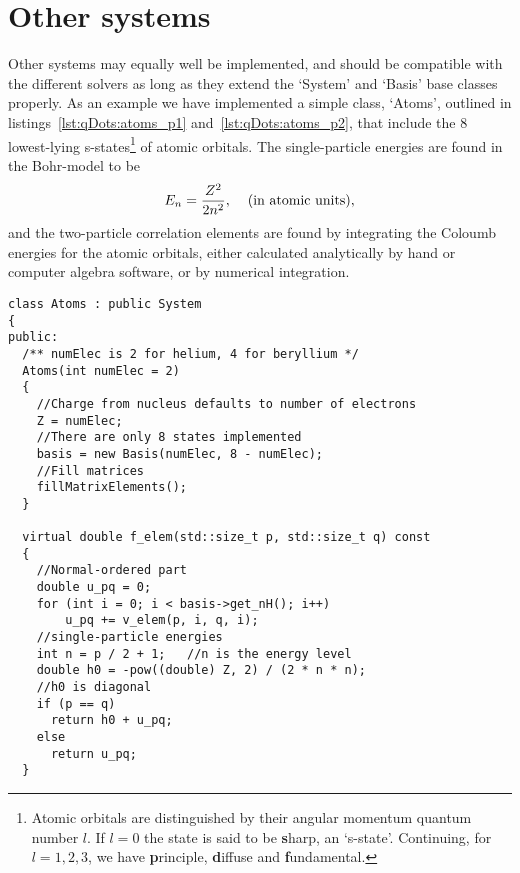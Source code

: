\section{Other systems}
Other systems may equally well be implemented, and should be compatible with the different solvers as long as they extend the `System' and `Basis' base classes properly.
As an example we have implemented a simple class, `Atoms', outlined in listings~\ref{lst:qDots:atoms_p1} and~\ref{lst:qDots:atoms_p2}, that include the 8 lowest-lying s-states\footnote{Atomic orbitals are distinguished by their angular momentum quantum number $l$. If $l=0$ the state is said to be \textbf{s}harp, an `s-state'. Continuing, for $l=1,2,3$, we have \textbf{p}rinciple, \textbf{d}iffuse and \textbf{f}undamental.} of atomic orbitals.
The single-particle energies are found in the Bohr-model to be
\begin{equation}
E_n = \frac{Z^2}{2n^2}, \hspace{4mm}\textrm{(in atomic units)},
\end{equation}
and the two-particle correlation elements are found by integrating the Coloumb energies for the atomic orbitals, either calculated analytically by hand or computer algebra software, or by numerical integration.
\begin{lstlisting}[float,label={lst:qDots:atoms_p1},caption={Simple implementation for the first sharp atomic orbitals. Continued in listing~\ref{lst:qDots:atoms_p2}.},name={lst:qDots:atoms}]
class Atoms : public System
{
public:
  /** numElec is 2 for helium, 4 for beryllium */
  Atoms(int numElec = 2)
  {
    //Charge from nucleus defaults to number of electrons
    Z = numElec;
    //There are only 8 states implemented
    basis = new Basis(numElec, 8 - numElec);
    //Fill matrices
    fillMatrixElements();
  }

  virtual double f_elem(std::size_t p, std::size_t q) const
  {
    //Normal-ordered part
    double u_pq = 0;
    for (int i = 0; i < basis->get_nH(); i++)
        u_pq += v_elem(p, i, q, i);
	//single-particle energies
    int n = p / 2 + 1;	 //n is the energy level
	double h0 = -pow((double) Z, 2) / (2 * n * n);
	//h0 is diagonal
    if (p == q)
      return h0 + u_pq;
    else
      return u_pq;
  }
\end{lstlisting}
